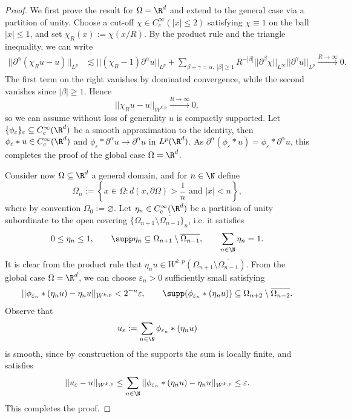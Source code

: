 \documentclass[reqno]{amsart}
\theoremstyle{definition}
\theoremstyle{remark}
\renewcommand{\epsilon}{\varepsilon}
\begin{document}
\begin{proof}
	We first prove the result for $\Omega = \R^d$ and extend to the general case via a partition of unity. Choose a cut-off $\chi \in C^\infty_c (|x| \leq 2)$ satisfying $\chi \equiv 1$ on the ball $|x| \leq 1$, and set $\chi_R (x) := \chi (x/R)$. By the product rule and the triangle inequality, we can write
		\begin{align*}
			|| \partial^\alpha (\chi_R u - u) ||_{L^p}
				&\lesssim  || (\chi_R - 1) \partial^\alpha u||_{L^p}  + \sum_{\beta + \gamma = \alpha, \ |\beta| \geq 1} R^{-|\beta|} ||\partial^\beta \chi ||_{L^\infty} ||\partial^\gamma u||_{L^p} \overset{R \to \infty}{\longrightarrow} 0.
		\end{align*}
	The first term on the right vanishes by dominated convergence, while the second vanishes since $|\beta| \geq 1$. Hence
		\[ ||\chi_R u - u||_{W^{k, p}} \overset{R \to \infty}{\longrightarrow} 0, \]
	so we can assume without loss of generality $u$ is compactly supported. Let $\{ \phi_\epsilon \}_\epsilon \subseteq C^\infty_c (\R^d)$ be a smooth approximation to the identity, then $\phi_\epsilon * u \in C^\infty_c (\R^d)$ and  $\phi_\epsilon * \partial^\alpha u \to \partial^\alpha u$ in $L^p (\R^d)$. As $\partial^\alpha (\phi_\epsilon * u) = \phi_\epsilon * \partial^\alpha u$, this completes the proof of the global case $\Omega = \R^d$.  

	Consider now $\Omega \subseteq \R^d$ a general domain, and for $n \in \N$ define
		\[ \Omega_n := \left\{ x \in \Omega : d(x, \partial \Omega) > \frac1n \text{ and } |x| < n \right\}, \]
	where by convention $\Omega_0 := \varnothing$. Let $\eta_n \in C^\infty_c (\R^d)$ be a partition of unity subordinate to the open covering $\{\Omega_{n + 1} \setminus \overline{\Omega_{n - 1}}\}_n$, i.e. it satisfies 
		\[ 0 \leq \eta_n \leq 1, \qquad \supp \eta_n \subseteq \Omega_{n + 1} \setminus \overline{\Omega_{n - 1}}, \qquad \sum_{n \in \N} \eta_n = 1. \]
	It is clear from the product rule that $\eta_n u \in W^{k, p} (\Omega_{n + 1} \setminus \overline{\Omega_{n - 1}})$. From the global case $\Omega = \R^d$, we can choose $\epsilon_n > 0$ sufficiently small satisfying
		\[ || \phi_{\epsilon_n} * (\eta_n u) - \eta_n u ||_{W^{k, p}} < 2^{-n} \epsilon, \qquad \supp (\phi_{\epsilon_n} * (\eta_n u)) \subseteq \Omega_{n + 2} \setminus \overline{\Omega_{n - 2}}. \]
	Observe that
		\[ u_\epsilon := \sum_{n \in \N} \phi_{\epsilon_n} * (\eta_n u) \]
	is smooth, since by construction of the supports the sum is locally finite, and satisfies
		\[ ||u_\epsilon - u||_{W^{k, p}} \leq \sum_{n \in \N} ||\phi_{\epsilon_n} * (\eta_n u) - \eta_n u||_{W^{k, p}}  \leq \epsilon.  \]
	This completes the proof. 	
\end{proof}
\end{document}
